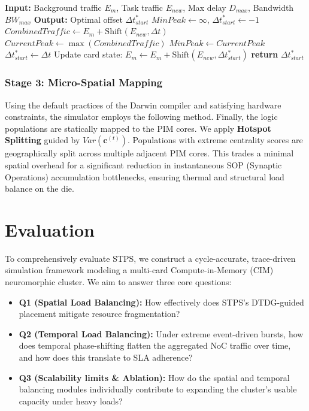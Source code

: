 \documentclass[letterpaper,twocolumn,10pt]{article}
\begin{document}
\begin{algorithm}[h]
\caption{Temporal Phase-Shifting Dispatch}
\label{alg:phase_shift}
\begin{algorithmic}[1]
\State \textbf{Input:} Background traffic $E_{m}$, Task traffic $E_{new}$, Max delay $D_{max}$, Bandwidth $BW_{max}$
\State \textbf{Output:} Optimal offset $\Delta t_{start}^*$
\State $MinPeak \gets \infty$, $\Delta t_{start}^* \gets -1$
    \State $CombinedTraffic \gets E_{m} + \text{Shift}(E_{new}, \Delta t)$
    \State $CurrentPeak \gets \max(CombinedTraffic)$
        \State $MinPeak \gets CurrentPeak$
        \State $\Delta t_{start}^* \gets \Delta t$
    \EndIf
\EndFor
\State Update card state: $E_{m} \gets E_{m} + \text{Shift}(E_{new}, \Delta t_{start}^*)$
\State \textbf{return} $\Delta t_{start}^*$
\end{algorithmic}
\end{algorithm}

\subsubsection{Stage 3: Micro-Spatial Mapping}
Using the default practices of the Darwin compiler and satisfying hardware constraints, the simulator employs the following method. Finally, the logic populations are statically mapped to the PIM cores. We apply \textbf{Hotspot Splitting} guided by $Var(\mathbf{c}^{(t)})$. Populations with extreme centrality scores are geographically split across multiple adjacent PIM cores. This trades a minimal spatial overhead for a significant reduction in instantaneous SOP (Synaptic Operations) accumulation bottlenecks, ensuring thermal and structural load balance on the die.


\section{Evaluation}
\label{sec:eval}
To comprehensively evaluate STPS, we construct a cycle-accurate, trace-driven simulation framework modeling a multi-card Compute-in-Memory (CIM) neuromorphic cluster. We aim to answer three core questions:
\begin{itemize}
    \item \textbf{Q1 (Spatial Load Balancing):} How effectively does STPS's DTDG-guided placement mitigate resource fragmentation?
    \item \textbf{Q2 (Temporal Load Balancing):} Under extreme event-driven bursts, how does temporal phase-shifting flatten the aggregated NoC traffic over time, and how does this translate to SLA adherence?
    \item \textbf{Q3 (Scalability limits \& Ablation):} How do the spatial and temporal balancing modules individually contribute to expanding the cluster's usable capacity under heavy loads?
\end{itemize}
\end{document}
